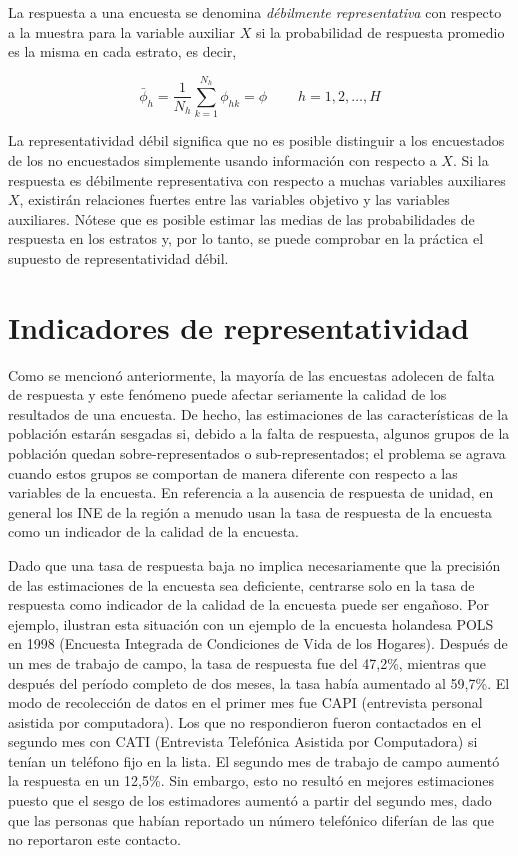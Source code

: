 \documentclass[
  12pt,
]{book}
\begin{document}
La respuesta a una encuesta se denomina \emph{débilmente representativa}
con respecto a la muestra para la variable auxiliar \(X\) si la probabilidad
de respuesta promedio es la misma en cada estrato, es decir,

\[
\bar{\phi}_{h} =  
\frac{1}{N_{h}}\sum_{k=1}^{N_{h}}\phi_{hk} =
\phi \ \ \ \ \ \ \ \ \ \  h=1,2,\ldots,H
\]

La representatividad débil significa que no es posible distinguir
a los encuestados de los no encuestados simplemente usando información
con respecto a \(X\). Si la respuesta es débilmente representativa con respecto a muchas variables auxiliares \(X\), existirán relaciones fuertes entre las variables objetivo y las variables auxiliares. Nótese que es posible estimar las medias de las probabilidades de respuesta en los estratos y, por lo tanto, se puede comprobar en la práctica el supuesto de representatividad débil.

\hypertarget{indicadores-de-representatividad}{%
\section{Indicadores de representatividad}\label{indicadores-de-representatividad}}

Como se mencionó anteriormente, la mayoría de las encuestas adolecen de falta de respuesta y este fenómeno puede afectar seriamente la calidad de
los resultados de una encuesta. De hecho, las estimaciones de las características de la población estarán sesgadas si, debido a la falta de respuesta, algunos grupos de la población quedan sobre-representados o sub-representados; el problema se agrava cuando estos grupos
se comportan de manera diferente con respecto a las variables de la
encuesta. En referencia a la ausencia de respuesta de unidad, en general los INE de la región a menudo usan la tasa de respuesta de la encuesta como un indicador de la calidad de la encuesta.

Dado que una tasa de respuesta baja no implica necesariamente que la precisión de las estimaciones de la encuesta sea deficiente, centrarse solo en la tasa de respuesta como indicador de la calidad de la encuesta puede ser engañoso. Por ejemplo, \citet{Bethlehem_Cobben_Schouten_2009} ilustran esta situación con un ejemplo de la encuesta holandesa POLS en 1998 (Encuesta Integrada de Condiciones de Vida de los Hogares). Después de un mes de trabajo de campo, la tasa de respuesta fue del 47,2\%, mientras que después del período completo de dos meses, la tasa había aumentado al 59,7\%. El modo de recolección de datos en el primer mes fue CAPI (entrevista
personal asistida por computadora). Los que no respondieron fueron
contactados en el segundo mes con CATI (Entrevista Telefónica Asistida
por Computadora) si tenían un teléfono fijo en la lista. El segundo mes de trabajo de campo aumentó la respuesta en un 12,5\%. Sin embargo, esto no resultó en mejores estimaciones puesto que el sesgo de los estimadores aumentó a partir del segundo mes, dado que las personas que habían reportado un número telefónico diferían de las que no reportaron este contacto.
\end{document}
